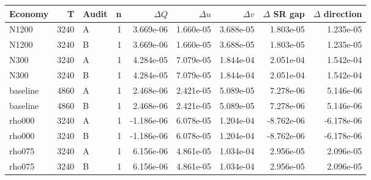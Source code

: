 \begin{tabular}{lrlrrrrrr}
\toprule
Economy & T & Audit & n & $\Delta Q$ & $\Delta u$ & $\Delta v$ & $\Delta$ SR gap & $\Delta$ direction \\
\midrule
N1200 & 3240 & A & 1 & 3.669e-06 & 1.660e-05 & 3.688e-05 & 1.803e-05 & 1.235e-05 \\
N1200 & 3240 & B & 1 & 3.669e-06 & 1.660e-05 & 3.688e-05 & 1.803e-05 & 1.235e-05 \\
N300 & 3240 & A & 1 & 4.284e-05 & 7.079e-05 & 1.844e-04 & 2.051e-04 & 1.542e-04 \\
N300 & 3240 & B & 1 & 4.284e-05 & 7.079e-05 & 1.844e-04 & 2.051e-04 & 1.542e-04 \\
baseline & 4860 & A & 1 & 2.468e-06 & 2.421e-05 & 5.089e-05 & 7.278e-06 & 5.146e-06 \\
baseline & 4860 & B & 1 & 2.468e-06 & 2.421e-05 & 5.089e-05 & 7.278e-06 & 5.146e-06 \\
rho000 & 3240 & A & 1 & -1.186e-06 & 6.078e-05 & 1.204e-04 & -8.762e-06 & -6.178e-06 \\
rho000 & 3240 & B & 1 & -1.186e-06 & 6.078e-05 & 1.204e-04 & -8.762e-06 & -6.178e-06 \\
rho075 & 3240 & A & 1 & 6.156e-06 & 4.861e-05 & 1.034e-04 & 2.956e-05 & 2.096e-05 \\
rho075 & 3240 & B & 1 & 6.156e-06 & 4.861e-05 & 1.034e-04 & 2.956e-05 & 2.096e-05 \\
\bottomrule
\end{tabular}
